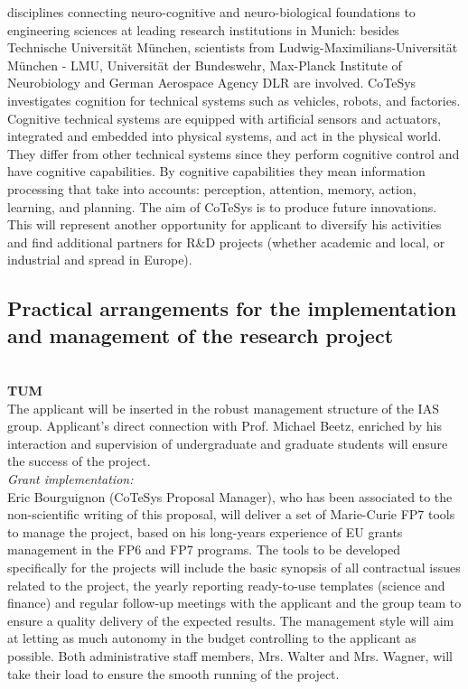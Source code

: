 disciplines    connecting    neuro-cognitive   and    neuro-biological
foundations to  engineering sciences at  leading research institutions
in  Munich: besides  Technische Universit\"at  M\"unchen,  scientists from
Ludwig-Maximilians-Universit\"at   M\"unchen   -   LMU,  Universit\"at   der
Bundeswehr, Max-Planck Institute  of Neurobiology and German Aerospace
Agency  DLR are involved. CoTeSys
investigates cognition for technical systems such as vehicles, robots,
and   factories.  Cognitive  technical   systems  are   equipped  with
artificial  sensors  and   actuators,  integrated  and  embedded  into
physical  systems, and  act in  the physical  world. They  differ from
other technical systems since  they perform cognitive control and have
cognitive   capabilities.   By   cognitive  capabilities   they   mean
information processing that take into accounts: perception, attention,
memory,  action, learning,  and planning.  The  aim of  CoTeSys is  to
produce future  innovations.  This will  represent another opportunity
for applicant to diversify his activities and find additional partners for R\&D
projects  (whether academic  and local,  or industrial  and  spread in
Europe).
\subsection{Practical arrangements for the implementation and 
management of the research project } 
\\
\textbf{TUM}\\
The applicant will be inserted in the robust management structure of the IAS group. 
Applicant's direct connection with Prof. Michael Beetz, enriched by his interaction 
and supervision of undergraduate and graduate students  will ensure the success of the project. \\
\emph{Grant implementation:}\\
Eric Bourguignon  (CoTeSys Proposal Manager), who  has been associated
to the  non-scientific writing of  this proposal, will deliver  a
set of Marie-Curie FP7  tools to manage the  project, based on
his long-years experience  of EU grants management in  the FP6 and FP7
programs. The tools to be developed specifically for the projects will
include the  basic synopsis of  all contractual issues related  to the
project,  the  yearly reporting  ready-to-use  templates (science  and
finance) and regular follow-up meetings  with the applicant and the group 
team to ensure  a quality  delivery of  the expected  results.  The management
style will aim  at letting as much autonomy  in the budget controlling
to the applicant as possible. Both  administrative staff members, Mrs. Walter and
Mrs. Wagner, will take their load  to ensure the smooth running of the
project.

